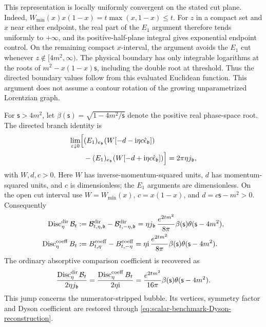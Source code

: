\documentclass[final,5p,times,twocolumn,numbers,nopreprintline]{elsarticle}
\numberwithin{equation}{section}
\theoremstyle{definition}
\theoremstyle{remark}
\newcommand{\ii}{\mathrm i}
\newcommand{\bb}{\mathfrak b}
\newcommand{\Disc}{\operatorname{Disc}}
\newcommand{\ee}{e_{\bb}}
\newcommand{\epsvec}{\hat\epsilon_{\bb}}
\newcommand{\je}{j_{\bb}}
\newcommand{\EoneDir}{(E_1)_{\ee}}
\newcommand{\sMand}{\mathsf{s}}
\begin{document}
This representation is locally uniformly convergent on the
stated cut plane. Indeed,
\(W_{\min}(x)x(1-x)=t\max(x,1-x)\leq t\).
For \(z\) in a compact set and \(x\) near either endpoint,
the real part of the \(E_1\) argument therefore tends uniformly
to \(+\infty\), and its positive-half-plane integral gives
exponential endpoint control. On the remaining compact
\(x\)-interval, the argument avoids the \(E_1\) cut whenever
\(z\notin[4m^2,\infty)\). The physical boundary has only
integrable logarithms at the roots of
\(m^2-x(1-x)\sMand\), including the double root at threshold.
Thus the directed boundary values follow from this evaluated
Euclidean function. This argument does not assume a contour
rotation of the growing unparametrized Lorentzian graph.

For \(\sMand>4m^2\), let
\(\beta(\sMand)=\sqrt{1-4m^2/\sMand}\) denote the positive
real phase-space root. The directed branch identity is
\[
\begin{aligned}
 \lim_{\varepsilon\downarrow0}\Bigl[&\EoneDir\!\left(W[-d-\ii\eta c\epsvec]\right)\\
       &-\EoneDir\!\left(W[-d+\ii\eta c\epsvec]\right)\Bigr]
       =2\pi\eta\je,
\end{aligned}
\]
with \(W,d,c>0\).
Here \(W\) has inverse-momentum-squared units, \(d\) has
momentum-squared units, and \(c\) is dimensionless; the
\(E_1\) arguments are dimensionless. On the open cut interval
use \(W=W_{\min}(x)\), \(c=x(1-x)\), and
\(d=c\sMand-m^2>0\). Consequently
\begin{align}
 \Disc^{\rm dir}_\eta\mathcal B_t
 &:=\mathcal B^{\rm dir}_{t,\eta,\bb}
       -\mathcal B^{\rm dir}_{t,-\eta,\bb}
   =\eta\je\,\frac{e^{2tm^2}}{8\pi}
                \beta(\sMand)\theta(\sMand-4m^2),
        \nonumber\\
 \Disc^{\rm coeff}_\eta B_t
 &:=B^{\rm coeff}_{t,\eta}-B^{\rm coeff}_{t,-\eta}
   =\eta\ii\,\frac{e^{2tm^2}}{8\pi}
                \beta(\sMand)\theta(\sMand-4m^2).
 \label{eq:gaussian-disc}
\end{align}
The ordinary absorptive comparison coefficient is recovered as
\begin{equation}
 \frac{\Disc^{\rm dir}_\eta\mathcal B_t}{2\eta\je}
   =\frac{\Disc^{\rm coeff}_\eta B_t}{2\eta\ii}
   =\frac{e^{2tm^2}}{16\pi}
              \beta(\sMand)\theta(\sMand-4m^2).
 \label{eq:Gaussian-directed-absorptive-coefficient}
\end{equation}
This jump concerns the numerator-stripped bubble. Its vertices,
symmetry factor and Dyson coefficient are restored through
\eqref{eq:scalar-benchmark-Dyson-reconstruction}.
\end{document}
